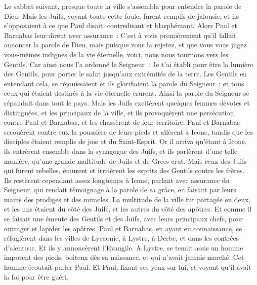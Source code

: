 \begin{multicols}{2}
Le sabbat suivant, presque toute la ville s'assembla pour entendre la parole de Dieu.
Mais les Juifs, voyant toute cette foule, furent remplis de jalousie, et ils s'opposaient à ce que Paul disait, contredisant et blasphémant.
Alors Paul et Barnabas leur dirent avec assurance~: C'est à vous premièrement qu'il fallait annoncer la parole de Dieu, mais puisque vous la rejetez, et que vous vous jugez vous-mêmes indignes de la vie éternelle, voici, nous nous tournons vers les Gentils.
Car ainsi nous l'a ordonné le Seigneur~: Je t'ai établi pour être la lumière des Gentils, pour porter le salut jusqu'aux extrémités de la terre.
Les Gentils en entendant cela, se réjouissaient et ils glorifiaient la parole du Seigneur~; et tous ceux qui étaient destinés à la vie éternelle crurent.
Ainsi la parole du Seigneur se répandait dans tout le pays.
Mais les Juifs excitèrent quelques femmes dévotes et distinguées, et les principaux de la ville, et ils provoquèrent une persécution contre Paul et Barnabas, et les chassèrent de leur territoire.
Paul et Barnabas secouèrent contre eux la poussière de leurs pieds et allèrent à Icone,
tandis que les disciples étaient remplis de joie et du Saint-Esprit.
\VerseOne{}Or il arriva qu'étant à Icone, ils entrèrent ensemble dans la synagogue des Juifs, et ils parlèrent d'une telle manière, qu'une grande multitude de Juifs et de Grecs crut.
Mais ceux des Juifs qui furent rebelles, émurent et irritèrent les esprits des Gentils contre les frères.
Ils restèrent cependant assez longtemps à Icone, parlant avec assurance du Seigneur, qui rendait témoignage à la parole de sa grâce, en faisant par leurs mains des prodiges et des miracles.
La multitude de la ville fut partagée en deux, et les uns étaient du côté des Juifs, et les autres du côté des apôtres.
Et comme il se faisait une émeute des Gentils et des Juifs, avec leurs principaux chefs, pour outrager et lapider les apôtres,
Paul et Barnabas, en ayant eu connaissance, se réfugièrent dans les villes de Lycaonie, à Lystre, à Derbe, et dans les contrées d'alentour.
Et ils y annoncèrent l'Evangile.
A Lystre, se tenait assis un homme impotent des pieds, boiteux dès sa naissance, et qui n'avait jamais marché.
Cet homme écoutait parler Paul. Et Paul, fixant ses yeux sur lui, et voyant qu'il avait la foi pour être guéri,

\end{multicols}
